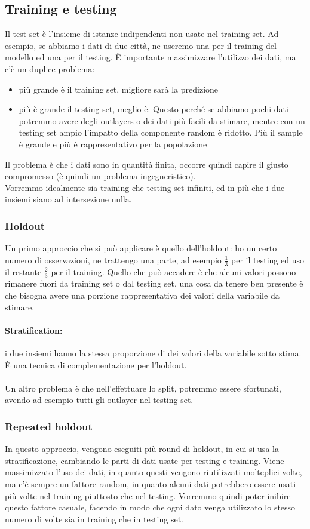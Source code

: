 \documentclass{article}
\begin{document}
\subsection{Training e testing}
Il test set è l'insieme di istanze indipendenti non usate nel training set. Ad esempio, se abbiamo i dati di due città, ne useremo una per il training del modello ed una per il testing. È importante massimizzare l'utilizzo dei dati, ma c'è un duplice problema:
\begin{itemize}
\item più grande è il training set, migliore sarà la predizione
\item più è grande il testing set, meglio è. Questo perché se abbiamo pochi dati potremmo avere degli outlayers o dei dati più facili da stimare, mentre con un testing set ampio l'impatto della componente random è ridotto. Più il sample è grande e più è rappresentativo per la popolazione
\end{itemize}
Il problema è che i dati sono in quantità finita, occorre quindi capire il giusto compromesso (è quindi un problema ingegneristico).\\ Vorremmo idealmente sia training che testing set infiniti, ed in più che i due insiemi siano ad intersezione nulla.
\subsubsection{Holdout}
Un primo approccio che si può applicare è quello dell'holdout: ho un certo numero di osservazioni, ne trattengo una parte, ad esempio $\frac{1}{3}$ per il testing ed uso il restante $\frac{2}{3}$ per il training. Quello che può accadere è che alcuni valori possono rimanere fuori da training set o dal testing set, una cosa da tenere ben presente è che bisogna avere una porzione rappresentativa dei valori della variabile da stimare.
\paragraph{Stratification:} i due insiemi hanno la stessa proporzione di dei valori della variabile sotto stima. È una tecnica di complementazione per l'holdout.\\\\ Un altro problema è che nell'effettuare lo split, potremmo essere sfortunati, avendo ad esempio tutti gli outlayer nel testing set.
\subsubsection{Repeated holdout}
In questo approccio, vengono eseguiti più round di holdout, in cui si usa la stratificazione, cambiando le parti di dati usate per testing e training. Viene massimizzato l'uso dei dati, in quanto questi vengono riutilizzati molteplici volte, ma c'è sempre un fattore random, in quanto alcuni dati potrebbero essere usati più volte nel training piuttosto che nel testing. Vorremmo quindi poter inibire questo fattore casuale, facendo in modo che ogni dato venga utilizzato lo stesso numero di volte sia in training che in testing set.
\end{document}
